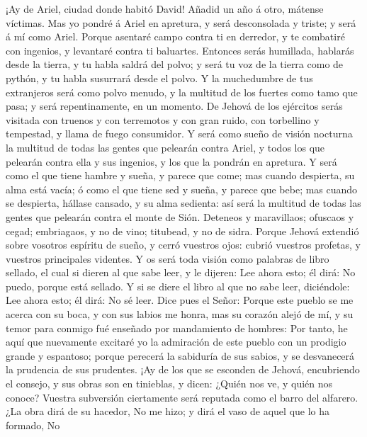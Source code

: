  ¡Ay de Ariel, ciudad donde habitó David! Añadid un año á
otro, mátense víctimas.  Mas yo pondré á Ariel en
apretura, y será desconsolada y triste; y será á mí como Ariel.
 Porque asentaré campo contra ti en derredor, y te
combatiré con ingenios, y levantaré contra ti baluartes. 
Entonces serás humillada, hablarás desde la tierra, y tu habla saldrá
del polvo; y será tu voz de la tierra como de pythón, y tu habla
susurrará desde el polvo.  Y la muchedumbre de tus
extranjeros será como polvo menudo, y la multitud de los fuertes como
tamo que pasa; y será repentinamente, en un momento.  De
Jehová de los ejércitos serás visitada con truenos y con terremotos y
con gran ruido, con torbellino y tempestad, y llama de fuego consumidor.
 Y será como sueño de visión nocturna la multitud de todas
las gentes que pelearán contra Ariel, y todos los que pelearán contra
ella y sus ingenios, y los que la pondrán en apretura.  Y
será como el que tiene hambre y sueña, y parece que come; mas cuando
despierta, su alma está vacía; ó como el que tiene sed y sueña, y parece
que bebe; mas cuando se despierta, hállase cansado, y su alma sedienta:
así será la multitud de todas las gentes que pelearán contra el monte de
Sión.  Deteneos y maravillaos; ofuscaos y cegad;
embriagaos, y no de vino; titubead, y no de sidra. 
Porque Jehová extendió sobre vosotros espíritu de sueño, y cerró
vuestros ojos: cubrió vuestros profetas, y vuestros principales
videntes.  Y os será toda visión como palabras de libro
sellado, el cual si dieren al que sabe leer, y le dijeren: Lee ahora
esto; él dirá: No puedo, porque está sellado.  Y si se
diere el libro al que no sabe leer, diciéndole: Lee ahora esto; él dirá:
No sé leer.  Dice pues el Señor: Porque este pueblo se me
acerca con su boca, y con sus labios me honra, mas su corazón alejó de
mí, y su temor para conmigo fué enseñado por mandamiento de hombres:
 Por tanto, he aquí que nuevamente excitaré yo la
admiración de este pueblo con un prodigio grande y espantoso; porque
perecerá la sabiduría de sus sabios, y se desvanecerá la prudencia de
sus prudentes.  ¡Ay de los que se esconden de Jehová,
encubriendo el consejo, y sus obras son en tinieblas, y dicen: ¿Quién
nos ve, y quién nos conoce?  Vuestra subversión
ciertamente será reputada como el barro del alfarero. ¿La obra dirá de
su hacedor, No me hizo; y dirá el vaso de aquel que lo ha formado, No
